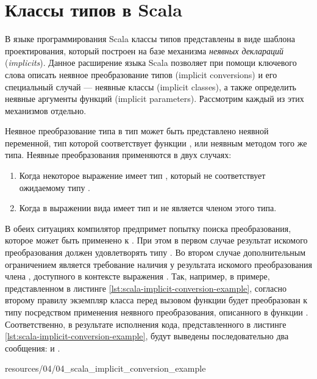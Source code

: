 \section{Классы типов в Scala}

В языке программирования Scala классы типов представлены в виде шаблона проектирования, который построен на базе механизма \emph{неявных деклараций} (\emph{implicits}). Данное расширение языка Scala позволяет при помощи ключевого слова  описать неявное преобразование типов (implicit conversions) и его специальный случай --- неявные классы (implicit classes), а также определить неявные аргументы функций (implicit parameters). Рассмотрим каждый из этих механизмов отдельно.

Неявное преобразование типа  в тип  может быть представлено неявной переменной, тип которой соответствует функции , или неявным методом того же типа. Неявные преобразования применяются в двух случаях:
\begin{enumerate}
	\item Когда некоторое выражение  имеет тип , который не соответствует ожидаемому типу .
	\item Когда в выражении вида   имеет тип  и  не является членом этого типа. 
\end{enumerate}
В обеих ситуациях компилятор предпримет попытку поиска преобразования, которое может быть применено к . При этом в первом случае результат искомого преобразования должен удовлетворять типу . Во втором случае дополнительным ограничением является требование наличия у результата искомого преобразования члена , доступного в контексте выражения . Так, например, в примере, представленном в листинге \ref{lst:scala-implicit-conversion-example}, согласно второму правилу экземпляр класса   перед вызовом функции  будет преобразован к типу  посредством применения неявного преобразования, описанного в функции . Соответственно, в результате исполнения кода, представленного в листинге  \ref{lst:scala-implicit-conversion-example}, будут выведены последовательно два сообщения:  и .


{resources/04/04_scala_implicit_conversion_example}

